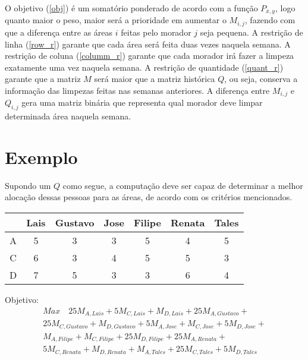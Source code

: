 \documentclass{article}
\begin{document}
    O objetivo (\ref{obj}) é um somatório ponderado de acordo com a função
    $P_{\bar{x},y}$, logo quanto maior o peso, maior será a prioridade em
    aumentar o $M_{i,j}$, fazendo com que a diferença entre as áreas $i$ feitas
    pelo morador $j$ seja pequena. A restrição de linha (\ref{row_r}) garante
    que cada área será feita duas vezes naquela semana. A restrição de coluna
    (\ref{columm_r}) garante que cada morador irá fazer a limpeza exatamente
    uma vez naquela semana. A restrição de quantidade (\ref{quant_r}) garante
    que a matriz $M$ será maior que a matriz histórica $Q$, ou seja, conserva
    a informação das limpezas feitas nas semanas anteriores. A diferença entre
    $M_{i,j}$ e $Q_{i,j}$ gera uma matriz binária que representa qual morador
    deve limpar determinada área naquela semana.

    \section{Exemplo}
    Supondo um $Q$ como segue, a computação deve ser capaz de determinar a melhor
    alocação dessas pessoas para as áreas, de acordo com os critérios mencionados. \\

    \begin{tabular}{c|cccccc}
          &    Lais  &    Gustavo &    Jose  &     Filipe &      Renata  &    Tales \\ 
        \hline
        A &    5     &  3         &    3     &     5      &      4       &    5     \\
        C &    6     &  3         &    4     &     5      &      5       &    3     \\
        D &    7     &  5         &    3     &     3      &      6       &    4     \\
    \end{tabular}
    \vspace{1cm}

    Objetivo:
    \begin{multline}
        Max \quad 25 M_{A,Lais} + 5 M_{C,Lais} + M_{D,Lais} + 25 M_{A,Gustavo} + \\
        25 M_{C,Gustavo} + M_{D,Gustavo} + 5 M_{A,Jose} + M_{C,Jose} + 5 M_{D,Jose} + \\
        M_{A,Filipe} + M_{C,Filipe} + 25 M_{D,Filipe} + 25 M_{A,Renata} + \\
        5 M_{C,Renata} + M_{D,Renata} + M_{A,Tales} + 25 M_{C,Tales} + 5 M_{D,Tales}
    \end{multline}
    \vspace{5mm}
\end{document}
